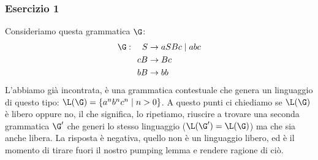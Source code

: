\documentclass[class=book, crop=false, oneside, 12pt]{standalone}
\begin{document}
  \subsubsection{Esercizio 1}
  Consideriamo questa grammatica \(\G\):
  \begin{align*}
    \G: \quad S &\to aSBc \mid abc \\
    \quad cB &\to Bc\\
    \quad bB &\to bb
  \end{align*}
  L'abbiamo già incontrata, è una grammatica contestuale che genera un linguaggio di questo tipo: \(\L(\G) = \{a^nb^nc^n \mid n > 0\}\). A questo punti ci chiediamo se \(\L(\G)\) è libero oppure no, il che significa, lo ripetiamo, riuscire a trovare una seconda grammatica \(\G'\) che generi lo stesso linguaggio (\(\L(\G') = \L(\G)\)) ma che sia anche libera. La risposta è negativa, quello non è un linguaggio libero, ed è il momento di tirare fuori il nostro pumping lemma e rendere ragione di ciò.
\end{document}
